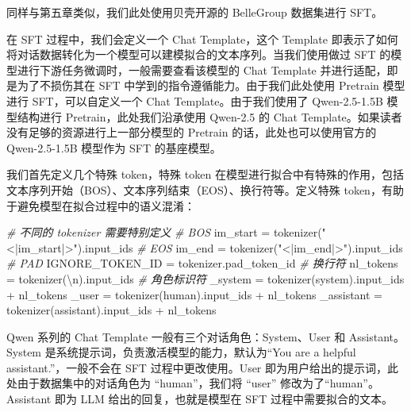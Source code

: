 \documentclass[
]{article}
\newenvironment{Shaded}{}{}
\newcommand{\CharTok}[1]{\textcolor[rgb]{0.25,0.44,0.63}{#1}}
\newcommand{\CommentTok}[1]{\textcolor[rgb]{0.38,0.63,0.69}{\textit{#1}}}
\newcommand{\NormalTok}[1]{#1}
\newcommand{\OperatorTok}[1]{\textcolor[rgb]{0.40,0.40,0.40}{#1}}
\newcommand{\StringTok}[1]{\textcolor[rgb]{0.25,0.44,0.63}{#1}}
\begin{document}
同样与第五章类似，我们此处使用贝壳开源的 BelleGroup 数据集进行 SFT。

在 SFT 过程中，我们会定义一个 Chat Template，这个 Template
即表示了如何将对话数据转化为一个模型可以建模拟合的文本序列。当我们使用做过
SFT 的模型进行下游任务微调时，一般需要查看该模型的 Chat Template
并进行适配，即是为了不损伤其在 SFT
中学到的指令遵循能力。由于我们此处使用 Pretrain 模型进行
SFT，可以自定义一个 Chat Template。由于我们使用了 Qwen-2.5-1.5B
模型结构进行 Pretrain，此处我们沿承使用 Qwen-2.5 的 Chat
Template。如果读者没有足够的资源进行上一部分模型的 Pretrain
的话，此处也可以使用官方的 Qwen-2.5-1.5B 模型作为 SFT 的基座模型。

我们首先定义几个特殊 token，特殊 token
在模型进行拟合中有特殊的作用，包括文本序列开始（BOS）、文本序列结束（EOS）、换行符等。定义特殊
token，有助于避免模型在拟合过程中的语义混淆：

\begin{Shaded}
\begin{Highlighting}[]

\CommentTok{\# 不同的 tokenizer 需要特别定义}
\CommentTok{\# BOS}
\NormalTok{im\_start }\OperatorTok{=}\NormalTok{ tokenizer(}\StringTok{"\textless{}|im\_start|\textgreater{}"}\NormalTok{).input\_ids}
\CommentTok{\# EOS}
\NormalTok{im\_end }\OperatorTok{=}\NormalTok{ tokenizer(}\StringTok{"\textless{}|im\_end|\textgreater{}"}\NormalTok{).input\_ids}
\CommentTok{\# PAD}
\NormalTok{IGNORE\_TOKEN\_ID }\OperatorTok{=}\NormalTok{ tokenizer.pad\_token\_id}
\CommentTok{\# 换行符}
\NormalTok{nl\_tokens }\OperatorTok{=}\NormalTok{ tokenizer(}\StringTok{\textquotesingle{}}\CharTok{\textbackslash{}n}\StringTok{\textquotesingle{}}\NormalTok{).input\_ids}
\CommentTok{\# 角色标识符}
\NormalTok{\_system }\OperatorTok{=}\NormalTok{ tokenizer(}\StringTok{\textquotesingle{}system\textquotesingle{}}\NormalTok{).input\_ids }\OperatorTok{+}\NormalTok{ nl\_tokens}
\NormalTok{\_user }\OperatorTok{=}\NormalTok{ tokenizer(}\StringTok{\textquotesingle{}human\textquotesingle{}}\NormalTok{).input\_ids }\OperatorTok{+}\NormalTok{ nl\_tokens}
\NormalTok{\_assistant }\OperatorTok{=}\NormalTok{ tokenizer(}\StringTok{\textquotesingle{}assistant\textquotesingle{}}\NormalTok{).input\_ids }\OperatorTok{+}\NormalTok{ nl\_tokens}
\end{Highlighting}
\end{Shaded}

Qwen 系列的 Chat Template 一般有三个对话角色：System、User 和
Assistant。System 是系统提示词，负责激活模型的能力，默认为``You are a
helpful assistant.''，一般不会在 SFT 过程中更改使用。User
即为用户给出的提示词，此处由于数据集中的对话角色为 ``human''，我们将
``user'' 修改为了``human''。Assistant 即为 LLM 给出的回复，也就是模型在
SFT 过程中需要拟合的文本。
\end{document}

